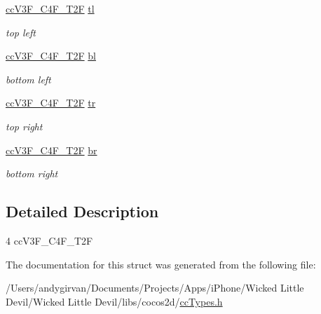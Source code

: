 \begin{DoxyCompactItemize}
\item 
\hypertarget{struct__cc_v3_f___c4_f___t2_f___quad_a272a3f177c91248a205d8992efc63b30}{\hyperlink{cc_types_8h_a9348d6a0d5bc04b1a161bb4b6e33d422}{cc\-V3\-F\-\_\-\-C4\-F\-\_\-\-T2\-F} \hyperlink{struct__cc_v3_f___c4_f___t2_f___quad_a272a3f177c91248a205d8992efc63b30}{tl}}\label{struct__cc_v3_f___c4_f___t2_f___quad_a272a3f177c91248a205d8992efc63b30}

\begin{DoxyCompactList}\small\item\em top left \end{DoxyCompactList}\item 
\hypertarget{struct__cc_v3_f___c4_f___t2_f___quad_a4c19ce71d6715428619948a2d3c908ab}{\hyperlink{cc_types_8h_a9348d6a0d5bc04b1a161bb4b6e33d422}{cc\-V3\-F\-\_\-\-C4\-F\-\_\-\-T2\-F} \hyperlink{struct__cc_v3_f___c4_f___t2_f___quad_a4c19ce71d6715428619948a2d3c908ab}{bl}}\label{struct__cc_v3_f___c4_f___t2_f___quad_a4c19ce71d6715428619948a2d3c908ab}

\begin{DoxyCompactList}\small\item\em bottom left \end{DoxyCompactList}\item 
\hypertarget{struct__cc_v3_f___c4_f___t2_f___quad_ae283d8a871b8baa9eb11c6682434c313}{\hyperlink{cc_types_8h_a9348d6a0d5bc04b1a161bb4b6e33d422}{cc\-V3\-F\-\_\-\-C4\-F\-\_\-\-T2\-F} \hyperlink{struct__cc_v3_f___c4_f___t2_f___quad_ae283d8a871b8baa9eb11c6682434c313}{tr}}\label{struct__cc_v3_f___c4_f___t2_f___quad_ae283d8a871b8baa9eb11c6682434c313}

\begin{DoxyCompactList}\small\item\em top right \end{DoxyCompactList}\item 
\hypertarget{struct__cc_v3_f___c4_f___t2_f___quad_a9440837a8b8095de560171d4692f34d3}{\hyperlink{cc_types_8h_a9348d6a0d5bc04b1a161bb4b6e33d422}{cc\-V3\-F\-\_\-\-C4\-F\-\_\-\-T2\-F} \hyperlink{struct__cc_v3_f___c4_f___t2_f___quad_a9440837a8b8095de560171d4692f34d3}{br}}\label{struct__cc_v3_f___c4_f___t2_f___quad_a9440837a8b8095de560171d4692f34d3}

\begin{DoxyCompactList}\small\item\em bottom right \end{DoxyCompactList}\end{DoxyCompactItemize}


\subsection{Detailed Description}
4 cc\-V3\-F\-\_\-\-C4\-F\-\_\-\-T2\-F 

The documentation for this struct was generated from the following file\-:\begin{DoxyCompactItemize}
\item 
/\-Users/andygirvan/\-Documents/\-Projects/\-Apps/i\-Phone/\-Wicked Little Devil/\-Wicked Little Devil/libs/cocos2d/\hyperlink{cc_types_8h}{cc\-Types.\-h}\end{DoxyCompactItemize}
